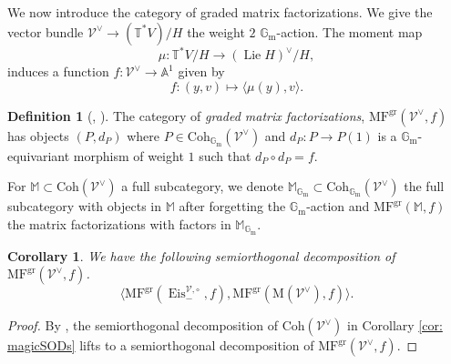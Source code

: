 \documentclass{amsart}
\newtheorem{corollary}[theorem]{Corollary}
\theoremstyle{definition}
\newtheorem{definition}[theorem]{Definition}
\theoremstyle{remark}
\numberwithin{equation}{section}
\DeclareMathOperator{\Lie}{Lie}
\newcommand{\mc}{\mathcal}
\newcommand{\A}{\mathbb{A}}
\newcommand{\bb}{\mathbb}
\newcommand{\Gm}{{\mathbb{G}_{\mathrm{m}}}}
\DeclareMathOperator{\Eis}{\mathrm{Eis}}
\newcommand{\Coh}{\mathrm{Coh}}
\newcommand{\T}{\mathbb{T}}
\DeclareMathOperator{\gr}{gr}
\newcommand{\MF}{\mathrm{MF}}
\newcommand{\M}{\mathrm{M}}
\begin{document}
We now introduce the category of graded matrix factorizations. We give the vector bundle $\mc{V}^{\vee} \rightarrow (\T^{\ast}V)/ H$ the weight $2$ $\Gm$-action.  The moment map
\begin{equation*}
    \mu: \T^{\ast}V / H \rightarrow (\Lie H)^\vee /H,
\end{equation*}
induces a function $f: \mc{V}^{\vee} \rightarrow \A^1$ given by
\begin{equation*}
    f: (y, v) \mapsto \langle \mu(y), v \rangle.
\end{equation*}
\begin{definition}[{\cite[\S2.7]{PTDolbeault}, \cite[\S2.6.2]{PTC3I}}]
    The category of \emph{graded matrix factorizations}, $\MF^{\gr}(\mc{V}^{\vee}, f)$ has objects $(P, d_P)$ where $P \in \Coh_{\Gm}(\mc{V}^{\vee})$ and $d_P: P \rightarrow P(1)$ is a $\Gm$-equivariant morphism of weight $1$ such that $d_P \circ d_P = f$. 

    For $\bb{M} \subset \Coh(\mc{V}^{\vee})$ a full subcategory, we denote $\bb{M}_{\Gm} \subset \Coh_{\Gm}(\mc{V}^{\vee})$ the full subcategory with objects in $\bb{M}$ after forgetting the $\Gm$-action and $\MF^{\gr}(\bb{M}, f)$ the matrix factorizations with factors in $\bb{M}_{\Gm}$.
\end{definition}
\begin{corollary}{\label{cor: MFSODs}}
    We have the following semiorthogonal decomposition of $\MF^{\gr}(\mc{V}^{\vee}, f)$.
    \begin{equation*}
  \langle \MF^{\gr}(\Eis_{-}^{\mc{V}, \circ}, f) , \MF^{\gr}(\M(\mc{V}^{\vee}), f) \rangle.
    \end{equation*}
\end{corollary}
\begin{proof}
By \cite[Proposition 2.5(b)]{PTC3I}, the semiorthogonal decomposition of $\Coh(\mc{V}^{\vee})$ in Corollary \ref{cor: magicSODs} lifts to a semiorthogonal decomposition of $\MF^{\gr}(\mc{V}^{\vee}, f)$.
\end{proof}
\end{document}
